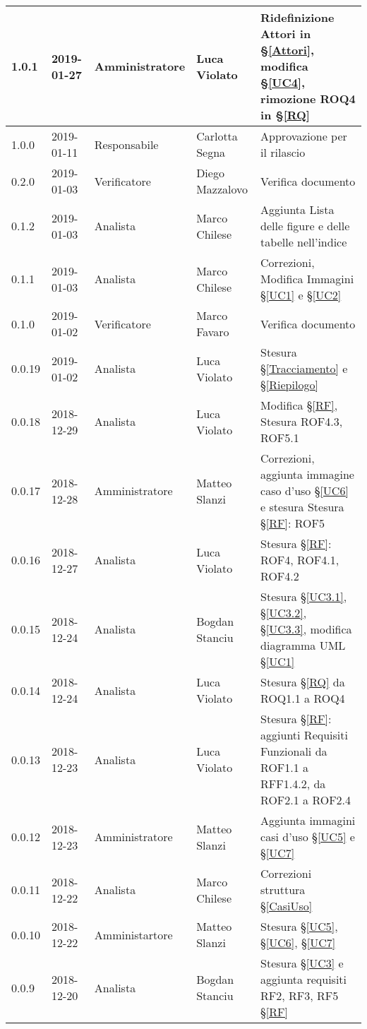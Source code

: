 \begin{center}
\begin{longtable}[c]{|m{}|m{}|m{}|m{}|p{}|}
\hline
\rowcolor{grigio}1.0.1 & 2019-01-27 & Amministratore & Luca Violato & Ridefinizione Attori in §\ref{Attori}, modifica §\ref{UC4}, rimozione ROQ4 in §\ref{RQ}\\
\hline
1.0.0 & 2019-01-11 & Responsabile & Carlotta Segna & Approvazione per il rilascio \\
\hline
\rowcolor{grigio}0.2.0 & 2019-01-03 & Verificatore & Diego Mazzalovo & Verifica documento\\
\hline
0.1.2 & 2019-01-03 & Analista & Marco Chilese & Aggiunta Lista delle figure e delle tabelle nell'indice\\
\hline
\rowcolor{grigio}0.1.1 & 2019-01-03 & Analista & Marco Chilese & Correzioni, Modifica Immagini §\ref{UC1} e §\ref{UC2}\\
\hline
 0.1.0 & 2019-01-02 & Verificatore & Marco Favaro & Verifica documento\\
\hline
\rowcolor{grigio}0.0.19 & 2019-01-02 & Analista & Luca Violato & Stesura §\ref{Tracciamento} e §\ref{Riepilogo}\\
\hline
0.0.18 & 2018-12-29 & Analista & Luca Violato & Modifica §\ref{RF}, Stesura ROF4.3, ROF5.1\\
\hline
\rowcolor{grigio}0.0.17 & 2018-12-28 & Amministratore & Matteo Slanzi & Correzioni, aggiunta immagine caso d'uso §\ref{UC6} e stesura Stesura §\ref{RF}: ROF5\\
\hline
0.0.16 & 2018-12-27 & Analista & Luca Violato & Stesura §\ref{RF}: ROF4, ROF4.1, ROF4.2\\
\hline
\rowcolor{grigio}0.0.15 & 2018-12-24 & Analista & Bogdan Stanciu & Stesura §\ref{UC3.1}, §\ref{UC3.2}, §\ref{UC3.3}, modifica diagramma UML §\ref{UC1} \\
\hline
0.0.14 & 2018-12-24 & Analista & Luca Violato & Stesura §\ref{RQ} da ROQ1.1 a ROQ4\\
\hline
\rowcolor{grigio}0.0.13 & 2018-12-23 & Analista & Luca Violato & Stesura §\ref{RF}: aggiunti Requisiti Funzionali da ROF1.1 a RFF1.4.2, da ROF2.1 a ROF2.4\\
\hline
0.0.12 & 2018-12-23 & Amministratore & Matteo Slanzi & Aggiunta immagini casi d'uso §\ref{UC5} e §\ref{UC7}\\
\hline
\rowcolor{grigio}0.0.11 & 2018-12-22 & Analista & Marco Chilese & Correzioni struttura §\ref{CasiUso}\\
\hline
0.0.10 & 2018-12-22 & Amministartore & Matteo Slanzi & Stesura §\ref{UC5}, §\ref{UC6}, §\ref{UC7}   \\
\hline
\rowcolor{grigio}0.0.9 & 2018-12-20 & Analista & Bogdan Stanciu & Stesura §\ref{UC3} e aggiunta requisiti RF2, RF3, RF5 §\ref{RF} \\

\end{longtable}
\end{center}

